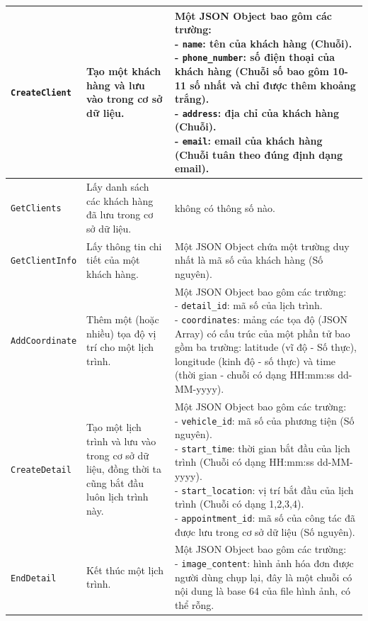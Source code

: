 \documentclass[a4paper]{article}
\begin{document}
\begin{longtable}{|m{3cm}|m{3.6cm}|m{6.8cm}|}
\texttt{CreateClient}&Tạo một khách hàng và lưu vào trong cơ sở dữ liệu.& \pbox{6.8cm}{Một JSON Object bao gôm các trường:\\- \texttt{name}: tên của khách hàng (Chuỗi). \\ 
- \texttt{phone\_number}: số điện thoại của khách hàng (Chuỗi số bao gôm 10-11 số nhất và chỉ được thêm khoảng trắng).\\
- \texttt{address}: địa chỉ của khách hàng (Chuỗi).\\
- \texttt{email}:  email của khách hàng (Chuỗi tuân theo đúng định dạng email).\\ }\\\hline
\texttt{GetClients}&Lấy danh sách các khách hàng đã lưu trong cơ sở dữ liệu.&không có thông số nào. \\\hline
\texttt{GetClientInfo}&Lấy thông tin chi tiết của một khách hàng.&Một JSON Object chứa một trường duy nhất là mã số của khách hàng (Số nguyên). \\\hline
\texttt{AddCoordinate}&Thêm một (hoặc nhiều) tọa độ vị trí cho một lịch trình.& \pbox{6.8cm}{Một JSON Object bao gôm các trường:\\
- \texttt{detail\_id}: mã số của lịch trình.\\ 
- \texttt{coordinates}: mảng các tọa độ (JSON Array) có cấu trúc của một phần tử bao gồm ba trường: latitude (vĩ độ - Số thực), longitude (kinh độ - số thực) và time (thời gian - chuỗi có dạng HH:mm:ss dd-MM-yyyy).\\}\\\hline
\texttt{CreateDetail}&Tạo một lịch trình và lưu vào trong cơ sở dữ liệu, đồng thời ta cũng bắt đầu luôn lịch trình này.& \pbox{6.8cm}{
Một JSON Object bao gôm các trường:\\
- \texttt{vehicle\_id}: mã số của phương tiện (Số nguyên).\\ 
- \texttt{start\_time}: thời gian bắt đầu của lịch trình (Chuỗi  có dạng HH:mm:ss dd-MM-yyyy).\\
- \texttt{start\_location}: vị trí bắt đầu của lịch trình (Chuỗi có dạng 1,2,3,4).\\
- \texttt{appointment\_id}: mã số của công tác đã được lưu trong cơ sở dữ liệu (Số  nguyên).\\ }  \\\hline
\texttt{EndDetail}&Kết thúc một lịch trình.& \pbox{6.8cm}{Một JSON Object bao gôm các trường:\\
- \texttt{image\_content}: hình ảnh hóa đơn được người dùng chụp lại, đây là một chuỗi có nội dung là base 64 của file hình ảnh, có thể rỗng.\\ 
}
\end{longtable}
\end{document}
